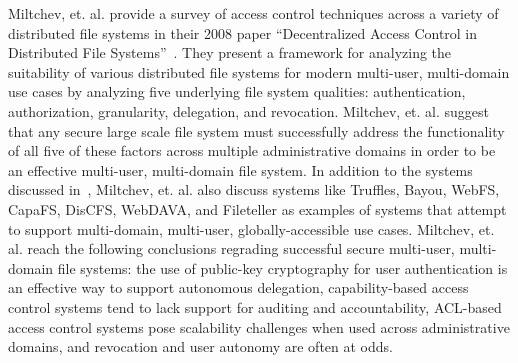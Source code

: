 \documentclass{sig-alternate}
\begin{document}
Miltchev, et. al. provide a survey of access control techniques across
a variety of distributed file systems in their 2008 paper
``Decentralized Access Control in Distributed File
Systems''~\cite{Miltchev2008}. They present a framework for analyzing
the suitability of various distributed file systems for modern
multi-user, multi-domain use cases by analyzing five underlying file
system qualities: authentication, authorization, granularity,
delegation, and revocation.  Miltchev, et. al. suggest that any secure
large scale file system must successfully address the functionality of
all five of these factors across multiple administrative domains in
order to be an effective multi-user, multi-domain file system. In
addition to the systems discussed in~\cite{Kher2005}, Miltchev,
et. al. also discuss systems like Truffles, Bayou, WebFS, CapaFS,
DisCFS, WebDAVA, and Fileteller as examples of systems that attempt to
support multi-domain, multi-user, globally-accessible use
cases. Miltchev, et. al. reach the following conclusions regrading
successful secure multi-user, multi-domain file systems: the use of
public-key cryptography for user authentication is an effective way to
support autonomous delegation, capability-based access control systems
tend to lack support for auditing and accountability, ACL-based access
control systems pose scalability challenges when used across
administrative domains, and revocation and user autonomy are often at
odds.
\end{document}
